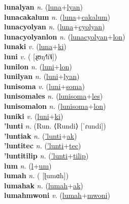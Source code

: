 \textbf{lunalyan} \textit{n.} (\hyperref[luna]{luna}+\hyperref[lyan]{lyan})
 \label{lunalyan} \\
\textbf{lunacakalum} \textit{n.} (\hyperref[luna]{luna}+\hyperref[cakalum]{cakalum})
 \label{lunacakalum} \\
\textbf{lunacyolyan} \textit{n.} (\hyperref[luna]{luna}+\hyperref[cyolyan]{cyolyan})
 \label{lunacyolyan} \\
\textbf{lunacyolyanlon} \textit{n.} (\hyperref[lunacyolyan]{lunacyolyan}+\hyperref[lon]{lon})
 \label{lunacyolyanlon} \\
\textbf{lunaki} \textit{v.} (\hyperref[luna]{luna}+\hyperref[ki]{ki})
 \label{lunaki} \\
\textbf{luni} \textit{v.} ( [ɻʊŋ˧˥i˥˩])
 \label{luni} \\
\textbf{lunilon} \textit{n.} (\hyperref[luni]{luni}+\hyperref[lon]{lon})
 \label{lunilon} \\
\textbf{lunilyan} \textit{n.} (\hyperref[luni]{luni}+\hyperref[lyan]{lyan})
 \label{lunilyan} \\
\textbf{lunisoma} \textit{v.} (\hyperref[luni]{luni}+\hyperref[soma]{soma})
 \label{lunisoma} \\
\textbf{lunisomales} \textit{n.} (\hyperref[lunisoma]{lunisoma}+\hyperref[les]{les})
 \label{lunisomales} \\
\textbf{lunisomalon} \textit{n.} (\hyperref[lunisoma]{lunisoma}+\hyperref[lon]{lon})
 \label{lunisomalon} \\
\textbf{luniki} \textit{v.} (\hyperref[luni]{luni}+\hyperref[ki]{ki})
 \label{luniki} \\
\textbf{'lunti} \textit{n.} (Run. ⟨Rundi⟩ [ˈɾundi])
 \label{'lunti} \\
\textbf{'luntiak} \textit{n.} (\hyperref['lunti]{'lunti}+\hyperref[ak]{ak})
 \label{'luntiak} \\
\textbf{'luntitec} \textit{n.} (\hyperref['lunti]{'lunti}+\hyperref[tec]{tec})
 \label{'luntitec} \\
\textbf{'luntitilip} \textit{n.} (\hyperref['lunti]{'lunti}+\hyperref[tilip]{tilip})
 \label{'luntitilip} \\
\textbf{lum} \textit{n.} (\hyperref[l]{l}+\hyperref[um]{um})
 \label{lum} \\
\textbf{lumah} \textit{n.} ( [ɭumɑh])
 \label{lumah} \\
\textbf{lumahak} \textit{n.} (\hyperref[lumah]{lumah}+\hyperref[ak]{ak})
 \label{lumahak} \\
\textbf{lumahmwoni} \textit{v.} (\hyperref[lumah]{lumah}+\hyperref[mwoni]{mwoni})
